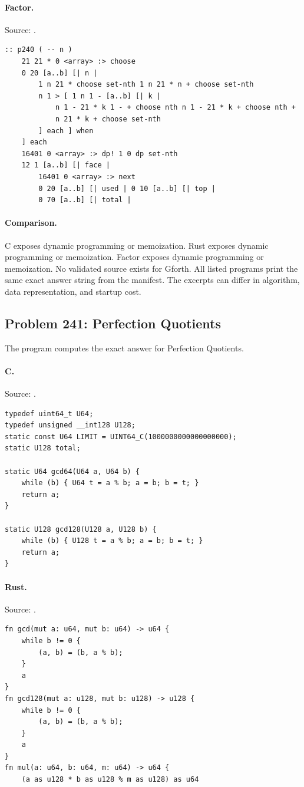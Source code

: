 \paragraph{Factor.} Source: .
\begin{lstlisting}
:: p240 ( -- n )
    21 21 * 0 <array> :> choose
    0 20 [a..b] [| n |
        1 n 21 * choose set-nth 1 n 21 * n + choose set-nth
        n 1 > [ 1 n 1 - [a..b] [| k |
            n 1 - 21 * k 1 - + choose nth n 1 - 21 * k + choose nth +
            n 21 * k + choose set-nth
        ] each ] when
    ] each
    16401 0 <array> :> dp! 1 0 dp set-nth
    12 1 [a..b] [| face |
        16401 0 <array> :> next
        0 20 [a..b] [| used | 0 10 [a..b] [| top |
        0 70 [a..b] [| total |
\end{lstlisting}

\paragraph{Comparison.}
C exposes dynamic programming or memoization. Rust exposes dynamic programming or memoization. Factor exposes dynamic programming or memoization.
No validated source exists for Gforth.
All listed programs print the same exact answer string from the manifest. The excerpts can differ in algorithm, data representation, and startup cost.

\subsection{Problem 241: Perfection Quotients}
\label{walkthrough:p241}
The program computes the exact answer for Perfection Quotients.

\paragraph{C.} Source: .
\begin{lstlisting}
typedef uint64_t U64;
typedef unsigned __int128 U128;
static const U64 LIMIT = UINT64_C(1000000000000000000);
static U128 total;

static U64 gcd64(U64 a, U64 b) {
    while (b) { U64 t = a % b; a = b; b = t; }
    return a;
}

static U128 gcd128(U128 a, U128 b) {
    while (b) { U128 t = a % b; a = b; b = t; }
    return a;
}
\end{lstlisting}

\paragraph{Rust.} Source: .
\begin{lstlisting}
fn gcd(mut a: u64, mut b: u64) -> u64 {
    while b != 0 {
        (a, b) = (b, a % b);
    }
    a
}
fn gcd128(mut a: u128, mut b: u128) -> u128 {
    while b != 0 {
        (a, b) = (b, a % b);
    }
    a
}
fn mul(a: u64, b: u64, m: u64) -> u64 {
    (a as u128 * b as u128 % m as u128) as u64
\end{lstlisting}

